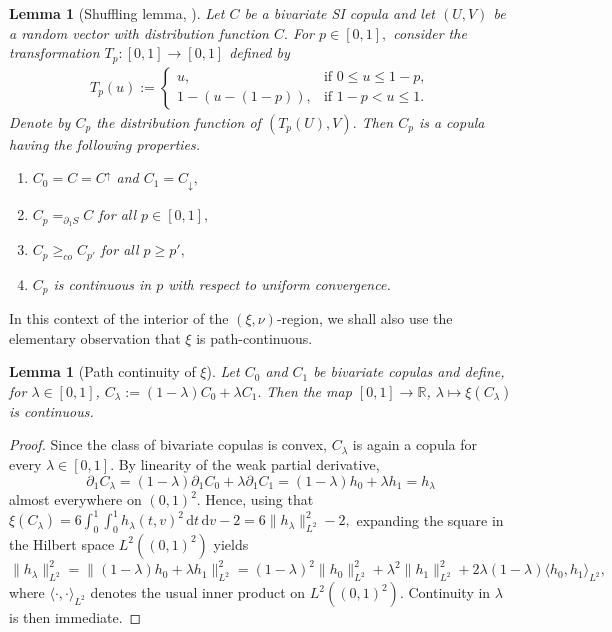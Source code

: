 \documentclass{article}
\newtheorem{lemma}[theorem]{Lemma}
\newcommand{\1}{\mathds{1}}
\newcommand{\de}{\mathrm{\,d}}
\newcommand{\R}{\mathbb{R}}
\begin{document}
\begin{lemma}[Shuffling lemma, \cite{ansari2025exact}]\label{lemshuff}
    Let \(C\) be a bivariate SI copula and let \((U,V)\) be a random vector with distribution function \(C.\) For \(p\in [0,1],\) consider the transformation \(T_p\colon [0,1]\to [0,1]\) defined by
    \begin{align}
        T_p(u) := \begin{cases}
        u, &\text{if } 0\le u \le 1-p,\\
        1-(u-(1-p)), & \text{if } 1-p < u \le 1.
    \end{cases}
    \end{align}
    Denote by \(C_p\) the distribution function of \((T_p(U),V).\) Then \(C_p\) is a copula having the following properties.
    \begin{enumerate}[label=(\roman*)]
        \item \label{lemshuff1} \(C_0 = C = C^\uparrow\) and \(C_1 = C_\downarrow,\)
        \item \label{lemshuff2} \(C_p =_{\partial_1 S} C\) for all \(p\in [0,1],\)
        \item \label{lemshuff3} \(C_p\geq_{co} C_{p'}\) for all \(p\geq p',\)
        \item \label{lemshuff4} \(C_p\) is continuous in \(p\) with respect to uniform convergence.
    \end{enumerate}
\end{lemma}

In this context of the interior of the $(\xi,\nu)$-region, we shall also use the elementary observation that $\xi$ is path-continuous.

\begin{lemma}[Path continuity of $\xi$]\label{lem:path_continuity_xi}
Let $C_0$ and $C_1$ be bivariate copulas and define, for $\lambda\in[0,1]$,
\(
C_\lambda:=(1-\lambda)C_0+\lambda C_1.
\)
Then the map \([0,1]\to\R\), \(\lambda\mapsto \xi(C_\lambda)\) is continuous.
\end{lemma}

\begin{proof}
Since the class of bivariate copulas is convex, $C_\lambda$ is again a copula for every $\lambda\in[0,1]$. By linearity of the weak partial derivative,
\[
\partial_1 C_\lambda
=
(1-\lambda)\partial_1 C_0+\lambda \partial_1 C_1
=
(1-\lambda)h_0+\lambda h_1
=
h_\lambda
\]
almost everywhere on $(0,1)^2$. Hence, using that
\(
\xi(C_\lambda)=6\int_0^1\int_0^1 h_\lambda(t,v)^2\de t\de v-2
=6\|h_\lambda\|_{L^2}^2-2,
\)
expanding the square in the Hilbert space $L^2((0,1)^2)$ yields
\[
\|h_\lambda\|_{L^2}^2
=
\|(1-\lambda)h_0+\lambda h_1\|_{L^2}^2 
=
(1-\lambda)^2\|h_0\|_{L^2}^2
+
\lambda^2\|h_1\|_{L^2}^2
+
2\lambda(1-\lambda)\langle h_0,h_1\rangle_{L^2},
\]
where $\langle\cdot,\cdot\rangle_{L^2}$ denotes the usual inner product on
$L^2((0,1)^2)$.
Continuity in $\lambda$ is then immediate.
\end{proof}
\end{document}
